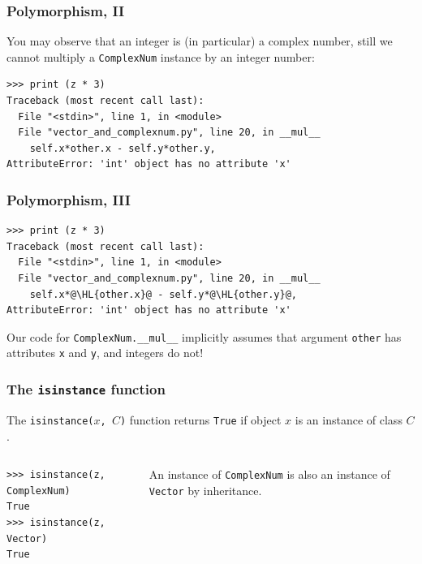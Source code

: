 \documentclass[english,serif,mathserif,xcolor=pdftex,dvipsnames,table]{beamer}
\begin{document}
\begin{frame}[fragile]
  \frametitle{Polymorphism, II}

  You may observe that an integer is (in particular) a complex number,
  still we cannot multiply a \texttt{ComplexNum} instance by an
  integer number:
\begin{lstlisting}
>>> print (z * 3)
Traceback (most recent call last):
  File "<stdin>", line 1, in <module>
  File "vector_and_complexnum.py", line 20, in __mul__
    self.x*other.x - self.y*other.y,
AttributeError: 'int' object has no attribute 'x'
\end{lstlisting}

\end{frame}


\begin{frame}[fragile]
  \frametitle{Polymorphism, III}

\begin{lstlisting}
>>> print (z * 3)
Traceback (most recent call last):
  File "<stdin>", line 1, in <module>
  File "vector_and_complexnum.py", line 20, in __mul__
    self.x*@\HL{other.x}@ - self.y*@\HL{other.y}@,
AttributeError: 'int' object has no attribute 'x'
\end{lstlisting}

  \+ Our code for \lstinline|ComplexNum.__mul__| implicitly assumes
  that argument \lstinline|other| has attributes \texttt{x} and
  \texttt{y}, and integers do not!
\end{frame}


\begin{frame}[fragile]
  \frametitle{The \texttt{isinstance} function}
  The \texttt{isinstance($x$, $C$)} function returns \texttt{True} if
  object $x$ is an instance of class $C$.

  \+
  \begin{columns}
    \begin{column}{0.5\textwidth}
\begin{lstlisting}
>>> isinstance(z, ComplexNum)
True
>>> isinstance(z, Vector)
True
\end{lstlisting}
    \end{column}
    \begin{column}{0.4\textwidth}
      \raggedleft
      An instance of \texttt{ComplexNum} is also an instance of
      \texttt{Vector} by inheritance.
    \end{column}
  \end{columns}
\end{frame}
\end{document}
